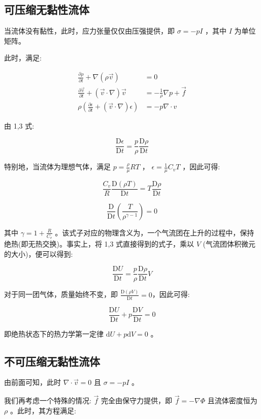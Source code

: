 \documentclass[fontset=windows]{article}
\begin{document}
\subsection{可压缩无黏性流体}

当流体没有黏性，此时，应力张量仅仅由压强提供，即 $\sigma = -p I$ ，其中 $I$ 为单位矩阵。

此时，满足:

$$
\begin{aligned}
    \frac{\partial \rho}{\partial t} + \nabla (\rho \vec{v}) &= 0 \\
    \frac{\partial \vec{v}}{\partial t} + (\vec{v} \cdot \nabla) \vec{v} &= - \frac{1}{\rho} \nabla {p} + \vec{f} \\
    \rho(\frac{\partial \epsilon}{\partial t} + (\vec{v} \cdot \nabla) \epsilon) &= -p \nabla \cdot v
\end{aligned}
$$

由 1,3 式:

$$
\frac{\mathrm{D}\epsilon}{\mathrm{D}t} = \frac{p}{\rho} \frac{\mathrm{D}\rho}{\mathrm{D}t}
$$

特别地，当流体为理想气体，满足 $p = \frac{\rho}{\mu} RT$ ， $\epsilon = \frac{1}{\mu} C_vT$ ，因此可得: 

$$
\frac{C_v}{R} \frac{\mathrm{D}(\rho T)}{\mathrm{D}t} = T \frac{\mathrm{D}\rho}{\mathrm{D}t}
$$

$$
\frac{\mathrm{D}}{\mathrm{D}t}(\frac{T}{\rho ^ {\gamma - 1}}) = 0
$$

其中 $\gamma = 1 + \frac{R}{C_v} $ 。该式子对应的物理含义为，一个气流团在上升的过程中，保持绝热(即无热交换)。事实上，将 1,3 式直接得到的式子，乘以 $V$ (气流团体积微元的大小)，便可以得到:

$$
\frac{\mathrm{D}U}{\mathrm{D}t} = \frac{p}{\rho} \frac{\mathrm{D}\rho}{\mathrm{D}t} V
$$

对于同一团气体，质量始终不变，即 $\frac{\mathrm{D}(\rho V)}{\mathrm{D}t} = 0$，因此可得:

$$
\frac{\mathrm{D}U}{\mathrm{D}t} + p \frac{\mathrm{D}V}{\mathrm{D}t} = 0
$$

即绝热状态下的热力学第一定律 $\mathrm{d}U + p \mathrm{d}V = 0$ 。

\subsection{不可压缩无黏性流体}

由前面可知，此时 $\nabla \cdot \vec{v} = 0$ 且 $\sigma = -p I$ 。

我们再考虑一个特殊的情况: $\vec{f}$ 完全由保守力提供，即 $\vec{f} = -\nabla \Phi$ 且流体密度恒为 $\rho$ 。此时，其方程满足:
\end{document}
